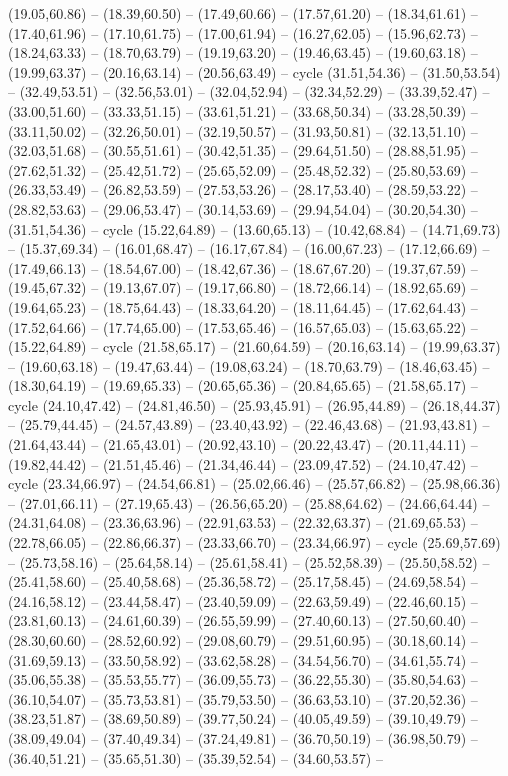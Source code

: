 {(19.05,60.86) -- (18.39,60.50) -- (17.49,60.66) -- (17.57,61.20) -- (18.34,61.61) -- (17.40,61.96) -- (17.10,61.75) -- (17.00,61.94) -- (16.27,62.05) -- (15.96,62.73) -- (18.24,63.33) -- (18.70,63.79) -- (19.19,63.20) -- (19.46,63.45) -- (19.60,63.18) -- (19.99,63.37) -- (20.16,63.14) -- (20.56,63.49) -- cycle (31.51,54.36) -- (31.50,53.54) -- (32.49,53.51) -- (32.56,53.01) -- (32.04,52.94) -- (32.34,52.29) -- (33.39,52.47) -- (33.00,51.60) -- (33.33,51.15) -- (33.61,51.21) -- (33.68,50.34) -- (33.28,50.39) -- (33.11,50.02) -- (32.26,50.01) -- (32.19,50.57) -- (31.93,50.81) -- (32.13,51.10) -- (32.03,51.68) -- (30.55,51.61) -- (30.42,51.35) -- (29.64,51.50) -- (28.88,51.95) -- (27.62,51.32) -- (25.42,51.72) -- (25.65,52.09) -- (25.48,52.32) -- (25.80,53.69) -- (26.33,53.49) -- (26.82,53.59) -- (27.53,53.26) -- (28.17,53.40) -- (28.59,53.22) -- (28.82,53.63) -- (29.06,53.47) -- (30.14,53.69) -- (29.94,54.04) -- (30.20,54.30) -- (31.51,54.36) -- cycle (15.22,64.89) -- (13.60,65.13) -- (10.42,68.84) -- (14.71,69.73) -- (15.37,69.34) -- (16.01,68.47) -- (16.17,67.84) -- (16.00,67.23) -- (17.12,66.69) -- (17.49,66.13) -- (18.54,67.00) -- (18.42,67.36) -- (18.67,67.20) -- (19.37,67.59) -- (19.45,67.32) -- (19.13,67.07) -- (19.17,66.80) -- (18.72,66.14) -- (18.92,65.69) -- (19.64,65.23) -- (18.75,64.43) -- (18.33,64.20) -- (18.11,64.45) -- (17.62,64.43) -- (17.52,64.66) -- (17.74,65.00) -- (17.53,65.46) -- (16.57,65.03) -- (15.63,65.22) -- (15.22,64.89) -- cycle (21.58,65.17) -- (21.60,64.59) -- (20.16,63.14) -- (19.99,63.37) -- (19.60,63.18) -- (19.47,63.44) -- (19.08,63.24) -- (18.70,63.79) -- (18.46,63.45) -- (18.30,64.19) -- (19.69,65.33) -- (20.65,65.36) -- (20.84,65.65) -- (21.58,65.17) -- cycle (24.10,47.42) -- (24.81,46.50) -- (25.93,45.91) -- (26.95,44.89) -- (26.18,44.37) -- (25.79,44.45) -- (24.57,43.89) -- (23.40,43.92) -- (22.46,43.68) -- (21.93,43.81) -- (21.64,43.44) -- (21.65,43.01) -- (20.92,43.10) -- (20.22,43.47) -- (20.11,44.11) -- (19.82,44.42) -- (21.51,45.46) -- (21.34,46.44) -- (23.09,47.52) -- (24.10,47.42) -- cycle (23.34,66.97) -- (24.54,66.81) -- (25.02,66.46) -- (25.57,66.82) -- (25.98,66.36) -- (27.01,66.11) -- (27.19,65.43) -- (26.56,65.20) -- (25.88,64.62) -- (24.66,64.44) -- (24.31,64.08) -- (23.36,63.96) -- (22.91,63.53) -- (22.32,63.37) -- (21.69,65.53) -- (22.78,66.05) -- (22.86,66.37) -- (23.33,66.70) -- (23.34,66.97) -- cycle (25.69,57.69) -- (25.73,58.16) -- (25.64,58.14) -- (25.61,58.41) -- (25.52,58.39) -- (25.50,58.52) -- (25.41,58.60) -- (25.40,58.68) -- (25.36,58.72) -- (25.17,58.45) -- (24.69,58.54) -- (24.16,58.12) -- (23.44,58.47) -- (23.40,59.09) -- (22.63,59.49) -- (22.46,60.15) -- (23.81,60.13) -- (24.61,60.39) -- (26.55,59.99) -- (27.40,60.13) -- (27.50,60.40) -- (28.30,60.60) -- (28.52,60.92) -- (29.08,60.79) -- (29.51,60.95) -- (30.18,60.14) -- (31.69,59.13) -- (33.50,58.92) -- (33.62,58.28) -- (34.54,56.70) -- (34.61,55.74) -- (35.06,55.38) -- (35.53,55.77) -- (36.09,55.73) -- (36.22,55.30) -- (35.80,54.63) -- (36.10,54.07) -- (35.73,53.81) -- (35.79,53.50) -- (36.63,53.10) -- (37.20,52.36) -- (38.23,51.87) -- (38.69,50.89) -- (39.77,50.24) -- (40.05,49.59) -- (39.10,49.79) -- (38.09,49.04) -- (37.40,49.34) -- (37.24,49.81) -- (36.70,50.19) -- (36.98,50.79) -- (36.40,51.21) -- (35.65,51.30) -- (35.39,52.54) -- (34.60,53.57) -- }
